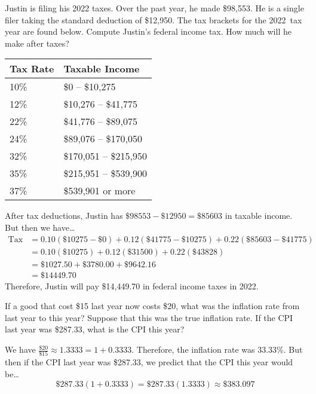 \documentclass[11pt,letterpaper]{article}
\begin{document}

 Justin is filing his 2022 taxes. Over the past year, he made \$98,553. He is a single filer taking the standard deduction of \$12,950. The tax brackets for the 2022~tax year are found below. Compute Justin's federal income tax. How much will he make after taxes?  \par
	\begin{table}[!ht]
	\centering
	\begin{tabular}{|l|l|} \hline
	Tax Rate & Taxable Income \\ \hline
	10\% & \$0 -- \$10,275 \\ \hline
	12\% & \$10,276 -- \$41,775 \\ \hline
	22\% & \$41,776 -- \$89,075 \\ \hline
	24\% & \$89,076 -- \$170,050 \\ \hline
	32\% & \$170,051 -- \$215,950 \\ \hline
	35\% & \$215,951 -- \$539,900 \\ \hline
	37\% & \$539,901 or more \\ \hline
	\end{tabular}
	\end{table} \pspace

\sol After tax deductions, Justin has $\$98553 - \$12950= \$85603$ in taxable income. But then we have\dots
	\[
	\begin{aligned}
	\text{Tax}&= 0.10(\$10275 - \$0) + 0.12(\$41775 - \$10275) + 0.22(\$85603 - \$41775) \\[0.3cm]
	&= 0.10(\$10275) + 0.12(\$31500) + 0.22(\$43828) \\[0.3cm]
	&= \$1027.50 + \$3780.00 + \$9642.16 \\[0.3cm]
	&= \$14449.70
	\end{aligned}
	\]
Therefore, Justin will pay \$14,449.70 in federal income taxes in 2022. 



\newpage



 If a good that cost \$15 last year now costs \$20, what was the inflation rate from last year to this year? Suppose that this was the true inflation rate. If the CPI last year was \$287.33, what is the CPI this year? \pspace

\sol We have $\frac{\$20}{\$15} \approx 1.3333= 1 + 0.3333$. Therefore, the inflation rate was 33.33\%. But then if the CPI last year was \$287.33, we predict that the CPI this year would be\dots
	\[
	\$287.33(1 + 0.3333)= \$287.33(1.3333) \approx \$383.097
	\]
\end{document}
